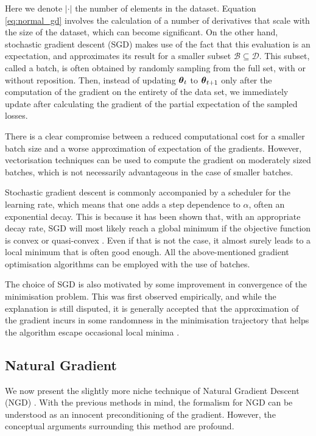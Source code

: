 Here we denote $|\cdot|$ the number of elements in the dataset. Equation \ref{eq:normal_gd} involves the calculation of a number of derivatives that scale with the size of the dataset, which can become significant. On the other hand, stochastic gradient descent (SGD) makes use of the fact that this evaluation is an expectation, and approximates its result for a smaller subset $\mathcal{B} \subseteq \mathcal{D}$. This subset, called a batch, is often obtained by randomly sampling from the full set, with or without reposition. Then, instead of updating $\boldsymbol{\theta}_t$ to $\boldsymbol{\theta}_{t + 1}$ only after the computation of the gradient on the entirety of the data set, we immediately update after calculating the gradient of the partial expectation of the sampled losses.

There is a clear compromise between a reduced computational cost for a smaller batch size and a worse approximation of expectation of the gradients. However, vectorisation techniques can be used to compute the gradient on moderately sized batches, which is not necessarily advantageous in the case of smaller batches.

Stochastic gradient descent is commonly accompanied by a scheduler for the learning rate, which means that one adds a step dependence to $\alpha$, often an exponential decay. This is because it has been shown that, with an appropriate decay rate, SGD will most likely reach a global minimum if the objective function is convex or quasi-convex \cite{kiwiel2001convergence}. Even if that is not the case, it almost surely leads to a local minimum that is often good enough.  All the above-mentioned gradient optimisation algorithms can be employed with the use of batches.

The choice of SGD is also motivated by some improvement in convergence of the minimisation problem. This was first observed empirically, and while the explanation is still disputed, it is generally accepted that the approximation of the gradient incurs in some randomness in the minimisation trajectory that helps the algorithm escape occasional local minima \cite{Bottou1991StochasticGL,Zhou2019TowardsUT}.


\subsection{Natural Gradient}

We now present the slightly more niche technique of Natural Gradient Descent (NGD) \cite{SR,amari1998natural}. With the previous methods in mind, the formalism for NGD can be understood as an innocent preconditioning of the gradient. However, the conceptual arguments surrounding this method are profound.

